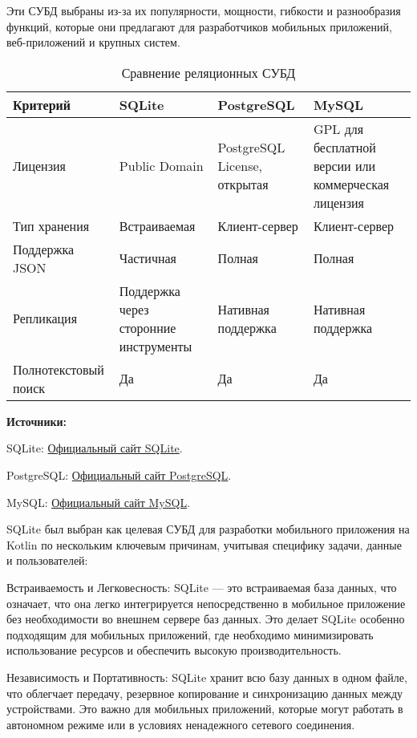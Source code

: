 Эти СУБД выбраны из-за их популярности, мощности, гибкости и разнообразия функций, которые они предлагают для разработчиков мобильных приложений, веб-приложений и крупных систем. 

\begin{table}[h]
	\caption{Сравнение реляционных СУБД}
	\label{tab:database_comparison}
	\begin{tabular}{|l|p{3cm}|p{3cm}|p{3cm}|}
		\hline
		\textbf{Критерий} & \textbf{SQLite} & \textbf{PostgreSQL} & \textbf{MySQL} \\
		\hline
		Лицензия & Public Domain \cite{sqlite} & PostgreSQL License, открытая \cite{postgresql} & GPL для бесплатной версии или коммерческая лицензия \cite{mysql} \\
		\hline
		Тип хранения & Встраиваемая & Клиент-сервер & Клиент-сервер \\
		\hline
		Поддержка JSON & Частичная & Полная & Полная \\
		\hline
		Репликация & Поддержка через сторонние инструменты & Нативная поддержка & Нативная поддержка \\
		\hline
		Полнотекстовый поиск & Да & Да & Да \\
		\hline
	\end{tabular}
\end{table}
\textbf{Источники:}

SQLite: \href{https://www.sqlite.org/index.html}{Официальный сайт SQLite}.

PostgreSQL: \href{https://www.postgresql.org/}{Официальный сайт PostgreSQL}.

MySQL: \href{https://www.mysql.com/}{Официальный сайт MySQL}.



SQLite был выбран как целевая СУБД для разработки мобильного приложения на Kotlin по нескольким ключевым причинам, учитывая специфику задачи, данные и пользователей:

Встраиваемость и Легковесность: SQLite — это встраиваемая база данных, что означает, что она легко интегрируется непосредственно в мобильное приложение без необходимости во внешнем сервере баз данных. Это делает SQLite особенно подходящим для мобильных приложений, где необходимо минимизировать использование ресурсов и обеспечить высокую производительность.

Независимость и Портативность: SQLite хранит всю базу данных в одном файле, что облегчает передачу, резервное копирование и синхронизацию данных между устройствами. Это важно для мобильных приложений, которые могут работать в автономном режиме или в условиях ненадежного сетевого соединения.

